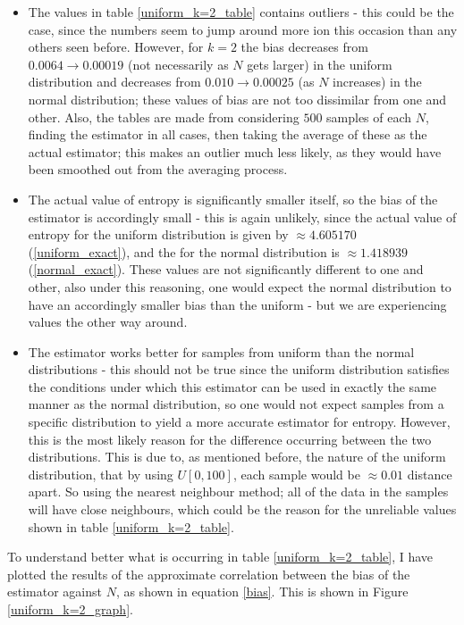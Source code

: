 \documentclass{article}
\begin{document}
\begin{itemize}
\item The values in table \ref{uniform_k=2_table} contains outliers - this could be the case, since the numbers seem to jump around more ion this occasion than any others seen before. However, for $k=2$ the bias decreases from $0.0064 \to 0.00019$ (not necessarily as $N$ gets larger) in the uniform distribution and decreases from $0.010 \to 0.00025$ (as $N$ increases) in the normal distribution; these values of bias are not too dissimilar from one and other. Also, the tables are made from considering $500$ samples of each $N$, finding the estimator in all cases, then taking the average of these as the actual estimator; this makes an outlier much less likely, as they would have been smoothed out from the averaging process.

\item The actual value of entropy is significantly smaller itself, so the bias of the estimator is accordingly small - this is again unlikely, since the actual value of entropy for the uniform distribution is given by $\approx 4.605170$ (\ref{uniform_exact}), and the for the normal distribution is $\approx 1.418939$ (\ref{normal_exact}). These values are not significantly different to one and other, also under this reasoning, one would expect the normal distribution to have an accordingly smaller bias than the uniform - but we are experiencing values the other way around.

\item The estimator works better for samples from uniform than the normal distributions - this should not be true since the uniform distribution satisfies the conditions under which this estimator can be used in exactly the same manner as the normal distribution, so one would not expect samples from a specific distribution to yield a more accurate estimator for entropy. However, this is the most likely reason for the difference occurring between the two distributions. This is due to, as mentioned before, the nature of the uniform distribution, that by using $U[0, 100]$, each sample would be $\approx 0.01$ distance apart. So using the nearest neighbour method; all of the data in the samples will have close neighbours, which could be the reason for the unreliable values shown in table \ref{uniform_k=2_table}.
\end{itemize}

To understand better what is occurring in table \ref{uniform_k=2_table}, I have plotted the results of the approximate correlation between the bias of the estimator against $N$, as shown in equation \ref{bias}. This is shown in Figure \ref{uniform_k=2_graph}.
\end{document}
